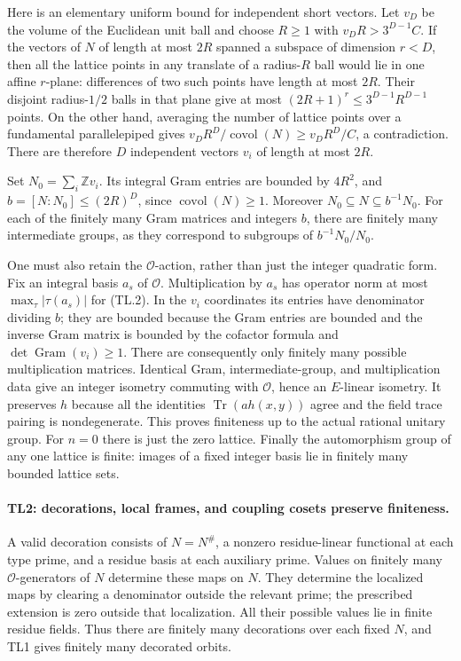Here is an elementary uniform bound for independent short vectors.
Let $v_D$ be the volume of the Euclidean unit ball and choose
$R\ge1$ with $v_D R>3^{D-1}C$. If the vectors of $N$ of length at
most $2R$ spanned a subspace of dimension $r<D$, then all the lattice
points in any translate of a radius-$R$ ball would lie in one affine
$r$-plane: differences of two such points have length at most $2R$.
Their disjoint radius-$1/2$ balls in that plane give at most
$(2R+1)^r\le3^{D-1}R^{D-1}$ points. On the other hand, averaging the
number of lattice points over a fundamental parallelepiped gives
$v_D R^D/\operatorname{covol}(N)\ge v_D R^D/C$, a contradiction.
There are therefore $D$ independent vectors $v_i$ of length at most
$2R$.

Set $N_0=\sum_i\mathbb Z v_i$. Its integral Gram entries are bounded
by $4R^2$, and $b=[N:N_0]\le(2R)^D$, since
$\operatorname{covol}(N)\ge1$. Moreover
$N_0\subseteq N\subseteq b^{-1}N_0$. For each of the finitely many
Gram matrices and integers $b$, there are finitely many intermediate
groups, as they correspond to subgroups of
$b^{-1}N_0/N_0$.

One must also retain the $\mathcal O$-action, rather than just the
integer quadratic form. Fix an integral basis $a_s$ of $\mathcal O$.
Multiplication by $a_s$ has operator norm at most
$\max_\tau|\tau(a_s)|$ for (TL.2). In the $v_i$ coordinates its
entries have denominator dividing $b$; they are bounded because the
Gram entries are bounded and the inverse Gram matrix is bounded by
the cofactor formula and $\det\operatorname{Gram}(v_i)\ge1$.
There are consequently only finitely many possible multiplication
matrices. Identical Gram, intermediate-group, and multiplication data
give an integer isometry commuting with $\mathcal O$, hence an
$E$-linear isometry. It preserves $h$ because all the identities
$\operatorname{Tr}(a h(x,y))$ agree and the field trace pairing is
nondegenerate. This proves finiteness up to the actual rational
unitary group. For $n=0$ there is just the zero lattice.
Finally the automorphism group of any one lattice is finite: images
of a fixed integer basis lie in finitely many bounded lattice sets.

\paragraph{TL2: decorations, local frames, and coupling cosets preserve
finiteness.}
A valid decoration consists of $N=N^\#$, a nonzero residue-linear
functional at each type prime, and a residue basis at each auxiliary
prime. Values on finitely many $\mathcal O$-generators of $N$
determine these maps on $N$. They determine the localized maps by
clearing a denominator outside the relevant prime; the prescribed
extension is zero outside that localization. All their possible
values lie in finite residue fields. Thus there are finitely many
decorations over each fixed $N$, and TL1 gives finitely many decorated
orbits.

